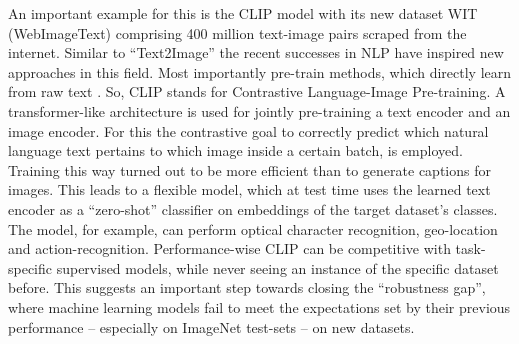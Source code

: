 \documentclass[
]{krantz}
\begin{document}
An important example for this is the CLIP model \citep{radford2021learning} with its new dataset WIT (WebImageText) comprising 400 million text-image pairs scraped from the internet.
Similar to ``Text2Image'' the recent successes in NLP have inspired new approaches in this field.
Most importantly pre-train methods, which directly learn from raw text \citep[e. g. GPT-n, Generative Pre-trained Transformer;][]{brown2020language}.
So, CLIP stands for Contrastive Language-Image Pre-training.
A transformer-like architecture is used for jointly pre-training a text encoder and an image encoder.
For this the contrastive goal to correctly predict which natural language text pertains to which image inside a certain batch, is employed.
Training this way turned out to be more efficient than to generate captions for images.
This leads to a flexible model, which at test time uses the learned text encoder as a ``zero-shot'' classifier on embeddings of the target dataset's classes.
The model, for example, can perform optical character recognition, geo-location and action-recognition.
Performance-wise CLIP can be competitive with task-specific supervised models, while never seeing an instance of the specific dataset before.
This suggests an important step towards closing the ``robustness gap'', where machine learning models fail to meet the expectations set by their previous performance -- especially on ImageNet test-sets -- on new datasets.
\end{document}
